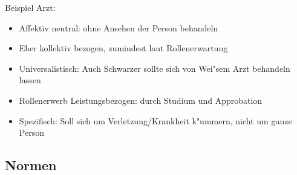 \documentclass[a4paper, 12pt]{scrartcl}
\begin{document}
\begin{itemize}
		Beispiel Arzt:
		\begin{itemize}
			\item
				Affektiv neutral: ohne Ansehen der Person behandeln
			\item
				Eher kollektiv bezogen, zumindest laut Rollenerwartung
			\item
				Universalistisch: Auch Schwarzer sollte sich von Wei"sem Arzt behandeln lassen
			\item
				Rollenerwerb Leistungsbezogen: durch Studium und Approbation
			\item
				Spezifisch: Soll sich um Verletzung/Krankheit k"ummern, nicht um ganze Person
		\end{itemize}
\end{itemize}

\subsection{Normen}
\end{document}
